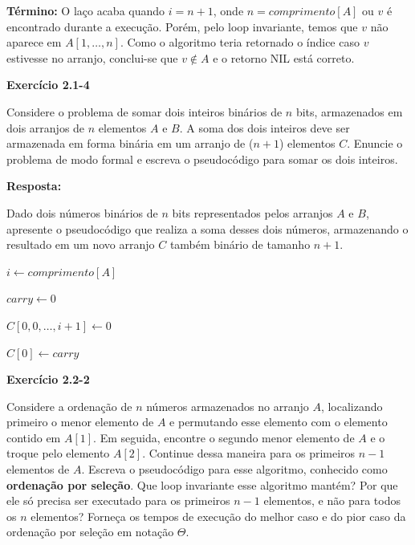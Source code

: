 \documentclass{article}
\begin{document}
    \textbf{Término:} O laço acaba quando $i = n + 1$, onde $n = comprimento[A]$ ou $v$ é encontrado durante a execução. Porém, pelo loop invariante, temos que $v$ não aparece em $A[1, \dots, n]$. Como o algoritmo teria retornado o índice caso $v$ estivesse no arranjo, conclui-se que $v \notin A$ e o retorno NIL está correto.

    \textbf{Exercício 2.1-4}

    Considere o problema de somar dois inteiros binários de $n$ bits, armazenados em dois arranjos de $n$ elementos $A$ e $B$. A soma dos dois inteiros deve ser armazenada em forma binária em um arranjo de ($n+1$) elementos $C$. Enuncie o problema de modo formal e escreva o pseudocódigo para somar os dois inteiros.

    \textbf{Resposta:}

    Dado dois números binários de $n$ bits representados pelos arranjos $A$ e $B$, apresente o pseudocódigo que realiza a soma desses dois números, armazenando o resultado em um novo arranjo $C$ também binário de tamanho $n+1$.
    
    \begin{algorithm}[H]
        \caption{Soma Binária}

        $i \leftarrow comprimento[A]$

        $carry \leftarrow 0$

        $C[0,0,\dots,i + 1] \leftarrow 0$

        
        $C[0] \leftarrow carry$

    \end{algorithm}

    \textbf{Exercício 2.2-2}

    Considere a ordenação de $n$ números armazenados no arranjo $A$, localizando primeiro o menor elemento de $A$ e permutando esse elemento com o elemento contido em $A[1]$. Em seguida, encontre o segundo menor elemento de $A$ e o troque pelo elemento $A[2]$. Continue dessa maneira para os primeiros $n-1$ elementos de $A$. Escreva o pseudocódigo para esse algoritmo, conhecido como \textbf{ordenação por seleção}. Que loop invariante esse algoritmo mantém? Por que ele só precisa ser executado para os primeiros $n-1$ elementos, e não para todos os $n$ elementos? Forneça os tempos de execução do melhor caso e do pior caso da ordenação por seleção em notação $\Theta$.
\end{document}
